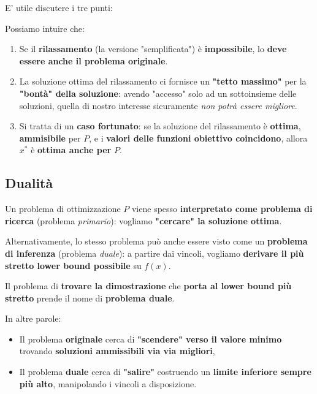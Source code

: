 E' utile discutere i tre punti:

\begin{remark} Possiamo intuire che:
    \begin{enumerate}
        \item Se il \textbf{rilassamento} (la versione "semplificata") 
            è \textbf{impossibile}, lo \textbf{deve essere anche
            il problema originale}.
        \item La soluzione ottima del rilassamento ci fornisce un
            \textbf{"tetto massimo"} per la \textbf{"bontà" della soluzione}: avendo
            "accesso" solo ad un sottoinsieme delle soluzioni, quella di nostro
            interesse sicuramente \textit{non potrà essere migliore}.
        \item Si tratta di un \textbf{caso fortunato}: se la soluzione del rilassamento
            è \textbf{ottima}, \textbf{ammisibile} per $P$, e i \textbf{valori delle
            funzioni obiettivo coincidono}, allora $x^*$ è \textbf{ottima anche per} $P$.
    \end{enumerate}
\end{remark}

\subsection{Dualità}

Un problema di ottimizzazione $P$ viene spesso \textbf{interpretato come problema di 
ricerca} (problema \textit{primario}): vogliamo \textbf{"cercare" la soluzione ottima}.

Alternativamente, lo stesso problema può anche essere visto come un \textbf{problema
di inferenza} (problema \textit{duale}): a partire dai vincoli, vogliamo \textbf{derivare il più stretto
lower bound possibile} su $f(x)$.

\begin{definition}
    Il problema di \textbf{trovare la dimostrazione} che \textbf{porta al
    lower bound più stretto} prende il nome di \textbf{problema duale}.
\end{definition}

\begin{remark}[INTERPRETAZIONE]
    In altre parole:
    \begin{itemize}
        \item Il problema \textbf{originale} cerca di \textbf{"scendere" verso il valore minimo} 
        trovando \textbf{soluzioni ammissibili via via migliori}, 
        \item Il problema \textbf{duale} cerca di \textbf{"salire"} costruendo un 
        \textbf{limite inferiore sempre più alto}, manipolando i vincoli a disposizione. 
    \end{itemize}
\end{remark}

